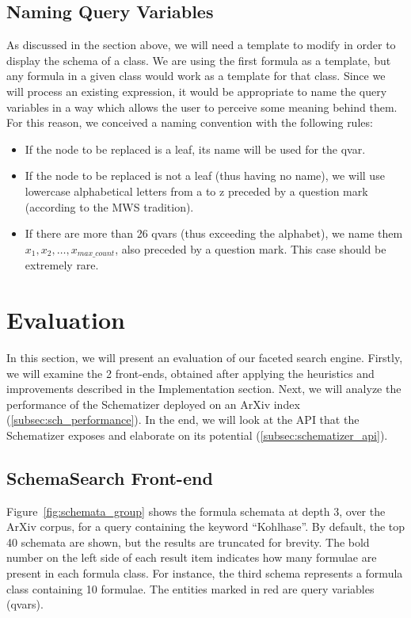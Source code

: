 \documentclass[a4paper,oneside]{article}
\def\MWS{\textsf{MWS}\xspace}
\def\arxiv{\textsf{ArXiv}\xspace}
\begin{document}
\subsection{Naming Query Variables}\label{subsec:naming_qvars}
As discussed in the section above, we will need a template to modify in order
to display the schema of a class. We are using the first formula as a template,
but any formula in a given class would work as a template for that class.
Since we will process an existing expression, it would be appropriate to name
the query variables in a way which allows the user to perceive some meaning
behind them. For this reason, we conceived a naming convention with the
following rules:

\begin{itemize}
    \item If the node to be replaced is a leaf, its name will be used for the
        qvar.
    \item If the node to be replaced is not a leaf (thus having no name), we
        will use lowercase alphabetical letters from \textsf{a} to \textsf{z}
        preceded by a question mark (according to the \MWS tradition).
    \item If there are more than 26 qvars (thus exceeding the alphabet), we
        name them $x_{1}, x_{2}, \ldots, x_{max\_count}$, also preceded by a
        question mark. This case should be extremely rare.
\end{itemize}

\section{Evaluation}\label{sec:evaluation}

In this section, we will present an evaluation of our faceted search engine.
Firstly, we will examine the 2 front-ends, obtained after applying the
heuristics and improvements described in the Implementation section. Next, we
will analyze the performance of the Schematizer deployed on an \arxiv index
(\ref{subsec:sch_performance}). In the end, we will look at the API that the
Schematizer exposes and elaborate on its potential
(\ref{subsec:schematizer_api}).

\subsection{SchemaSearch Front-end}\label{subsec:fe_results_display1}
Figure~\ref{fig:schemata_group} shows the formula schemata at depth 3, over the
\arxiv corpus, for a query containing the keyword ``Kohlhase''. By default, the
top 40 schemata are shown, but the results are truncated for brevity.  The bold
number on the left side of each result item indicates how many formulae are
present in each formula class. For instance, the third schema represents a
formula class containing 10 formulae. The entities marked in red are query
variables (qvars).
\end{document}

